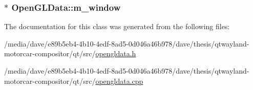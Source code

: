 \hypertarget{classOpenGLData_ad4867a83945326a3523a1aa54bc1f016}{
\subsubsection[{m\-\_\-window}]{$\ast$ Open\-G\-L\-Data\-::m\-\_\-window}}\label{classOpenGLData_ad4867a83945326a3523a1aa54bc1f016}


The documentation for this class was generated from the following files\-:\begin{DoxyCompactItemize}
\item 
/media/dave/e89b5eb4-\/4b10-\/4edf-\/8ad5-\/0d046a46b978/dave/thesis/qtwayland-\/motorcar-\/compositor/qt/src/\hyperlink{opengldata_8h}{opengldata.\-h}\item 
/media/dave/e89b5eb4-\/4b10-\/4edf-\/8ad5-\/0d046a46b978/dave/thesis/qtwayland-\/motorcar-\/compositor/qt/src/\hyperlink{opengldata_8cpp}{opengldata.\-cpp}\end{DoxyCompactItemize}
